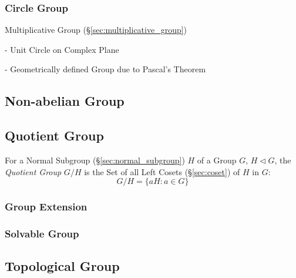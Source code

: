 \subsubsection{Circle Group}\label{sec:circle_group}

Multiplicative Group (\S\ref{sec:multiplicative_group})

- Unit Circle on Complex Plane

- Geometrically defined Group due to Pascal's Theorem
  \cite{lemmermeyer-shirali09}



\subsection{Non-abelian Group}\label{sec:nonabelian_group}

\subsection{Quotient Group}\label{sec:quotient_group}

For a Normal Subgroup (\S\ref{sec:normal_subgroup}) $H$ of a Group
$G$, $H \triangleleft G$, the \emph{Quotient Group} $G/H$ is the Set
of all Left Cosets (\S\ref{sec:coset}) of $H$ in $G$:
\[
    G/H = \{ aH : a \in G \}
\]



\subsubsection{Group Extension}\label{sec:group_extension}

\subsubsection{Solvable Group}\label{sec:solvable_group}



\subsection{Topological Group}\label{sec:topological_group}

